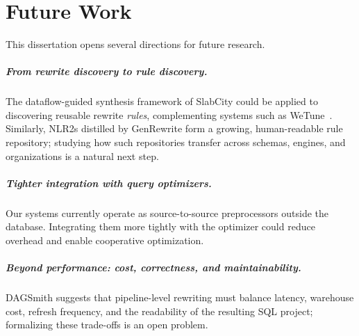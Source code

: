 \chapter{Future Work}
\label{chap:future}

This dissertation opens several directions for future research.

\paragraph{From rewrite discovery to rule discovery.}
The dataflow-guided synthesis framework of SlabCity could be applied
to discovering reusable rewrite \emph{rules}, complementing systems
such as WeTune~\cite{wetune}. Similarly, NLR2s distilled by GenRewrite
form a growing, human-readable rule repository; studying how such
repositories transfer across schemas, engines, and organizations is a
natural next step.

\paragraph{Tighter integration with query optimizers.}
Our systems currently operate as source-to-source preprocessors
outside the database. Integrating them more tightly with the
optimizer could reduce overhead and enable cooperative optimization.

\paragraph{Beyond performance: cost, correctness, and maintainability.}
DAGSmith suggests that pipeline-level rewriting must balance latency,
warehouse cost, refresh frequency, and the readability of the
resulting SQL project; formalizing these trade-offs is an open
problem.
